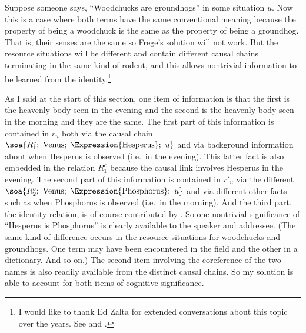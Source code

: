 
Suppose someone says, ``Woodchucks are groundhogs'' in some situation $u$. Now this is a case where both terms have the same conventional meaning because the property of being a woodchuck is the same as the property of being a groundhog. That is, their senses are the same so Frege's solution will not work. But the resource situations will be different and contain different causal chains terminating in the same kind of rodent, and this allows nontrivial information to be learned from the identity.\footnote{I would like to thank Ed Zalta for extended conversations about this topic over the years. See \citet[Chapter~VI]{zalta:ao} and \citet[Chapters~9--12]{zalta:ilmi}.}


As I said at the start of this section, one item of information is that the first is the heavenly body seen in the evening and the second is the heavenly body seen in the morning and they are the same. The first part of this information is contained in $r_u$ both via the causal chain $\soa{R^c_1;\ \hbox{Venus};\ \hbox{\Expression{Hesperus}};\ u}$ and via background information about when Hesperus is observed (i.e.\ in the evening). This latter fact is also embedded in the relation $R^c_1$ because the causal link involves Hesperus in the evening. The second part of this information is contained in $r'_u$ via the different  $\soa{R^c_2;\ \hbox{Venus};\ \hbox{\Expression{Phosphorus}};\ u}$ and via different other facts such as when Phosphorus is observed (i.e.\ in the morning). And the third part, the identity relation, is of course contributed by . So one nontrivial significance of ``Hesperus is Phosphorus'' is clearly available to the speaker and addressee. (The same kind of difference occurs in the resource situations for woodchucks and groundhogs. One term may have been encountered in the field and the other in a dictionary. And so on.) The second item involving the coreference of the two names is also readily available from the distinct causal chains. So my solution is able to account for both items of cognitive significance.

